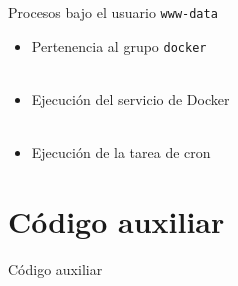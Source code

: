     \begin{frame}{Procesos bajo el usuario \texttt{www-data}}
        \begin{itemize}
            \item Pertenencia al grupo \texttt{docker}
            \\~\\
            \item Ejecución del servicio de Docker
            \\~\\
            \item Ejecución de la tarea de cron
        \end{itemize}
    \end{frame}

    
\section{Código auxiliar}

    \begin{frame}
        \Huge{\centerline{Código auxiliar}}
    \end{frame}

